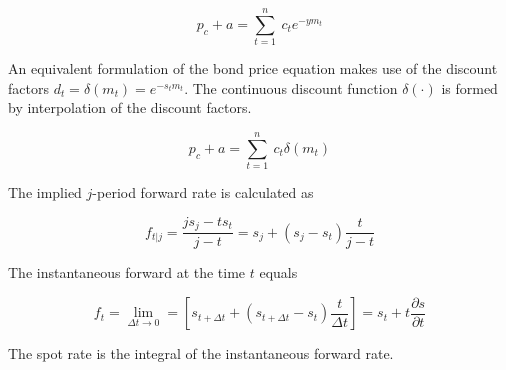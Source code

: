 \begin{equation}
  \label{yield}
  p_c+a=\sum_{t=1}^n \ c_t e^{-ym_t}
\end{equation}

An equivalent formulation of the bond price equation makes use of the discount factors $d_t=\delta(m_t)=e^{-s_tm_t}$. The continuous discount function $\delta(\cdot)$ is formed by interpolation of the discount factors.

\begin{equation}
  \label{bondprceq2}
  p_c+a=\sum_{t=1}^n \ c_t \delta(m_t) \end{equation}


The implied $j$-period forward rate is calculated as

\begin{equation}
  \label{forwrate}
  f_{t|j}=\frac{js_j-ts_t}{j-t}=s_j+(s_j-s_t)\frac{t}{j-t}
\end{equation}

The instantaneous forward at the time $t$ equals

\begin{equation}
  \label{instfwdrate}
  f_t=\lim_{\Delta t \rightarrow 0}=\left[s_{t+\Delta t}+(s_{t+\Delta t}-s_t)\frac{t}{\Delta t}\right]=s_t+t\frac{\partial s}{\partial t}
\end{equation}

The spot rate is the integral of the instantaneous forward rate.


